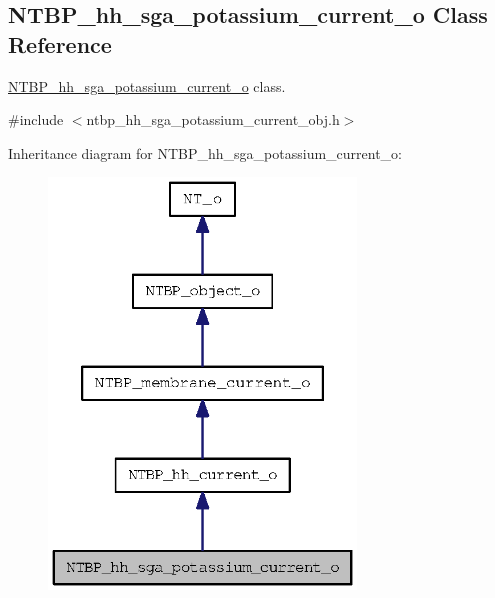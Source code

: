 \subsection{NTBP\_\-hh\_\-sga\_\-potassium\_\-current\_\-o Class Reference}
\label{class_n_t_b_p__hh__sga__potassium__current__o}


\hyperlink{class_n_t_b_p__hh__sga__potassium__current__o}{NTBP\_\-hh\_\-sga\_\-potassium\_\-current\_\-o} class.  




{\ttfamily \#include $<$ntbp\_\-hh\_\-sga\_\-potassium\_\-current\_\-obj.h$>$}



Inheritance diagram for NTBP\_\-hh\_\-sga\_\-potassium\_\-current\_\-o:
\nopagebreak
\begin{figure}[H]
\begin{center}
\leavevmode
\includegraphics[width=232pt]{class_n_t_b_p__hh__sga__potassium__current__o__inherit__graph}
\end{center}
\end{figure}



